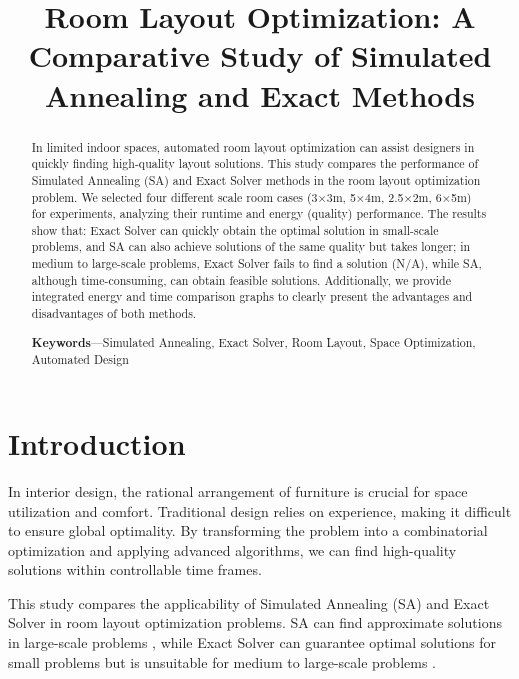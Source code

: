\documentclass[conference]{IEEEtran}
\begin{document}
\title{Room Layout Optimization: A Comparative Study of Simulated Annealing and Exact Methods}

\author{
}

\maketitle

\begin{abstract}
In limited indoor spaces, automated room layout optimization can assist designers in quickly finding high-quality layout solutions. This study compares the performance of Simulated Annealing (SA) and Exact Solver methods in the room layout optimization problem. We selected four different scale room cases (3×3m, 5×4m, 2.5×2m, 6×5m) for experiments, analyzing their runtime and energy (quality) performance. The results show that: Exact Solver can quickly obtain the optimal solution in small-scale problems, and SA can also achieve solutions of the same quality but takes longer; in medium to large-scale problems, Exact Solver fails to find a solution (N/A), while SA, although time-consuming, can obtain feasible solutions. Additionally, we provide integrated energy and time comparison graphs to clearly present the advantages and disadvantages of both methods.

\textbf{Keywords}---Simulated Annealing, Exact Solver, Room Layout, Space Optimization, Automated Design
\end{abstract}

\section{Introduction}
In interior design, the rational arrangement of furniture is crucial for space utilization and comfort. Traditional design relies on experience, making it difficult to ensure global optimality. By transforming the problem into a combinatorial optimization and applying advanced algorithms, we can find high-quality solutions within controllable time frames.

This study compares the applicability of Simulated Annealing (SA) and Exact Solver in room layout optimization problems. SA can find approximate solutions in large-scale problems \cite{b1}, while Exact Solver can guarantee optimal solutions for small problems but is unsuitable for medium to large-scale problems \cite{b2}.
\end{document}
